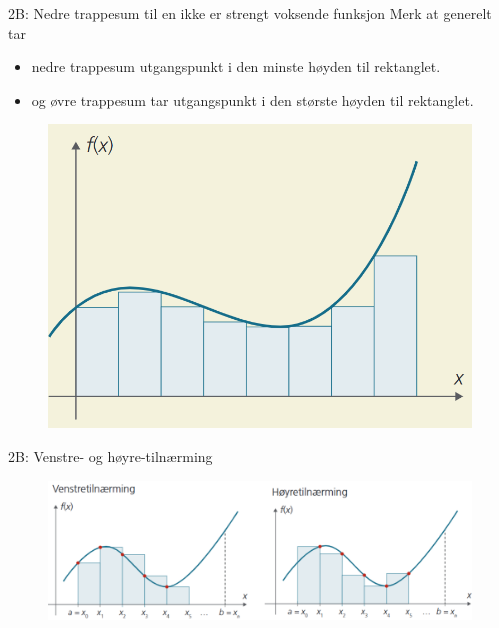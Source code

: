 
\blueheader
\begin{frame}{2B: Nedre trappesum til en ikke er strengt voksende funksjon}
Merk at generelt tar 
\begin{itemize}
    \item nedre trappesum utgangspunkt i den minste høyden til rektanglet.\\
    \item og øvre trappesum tar utgangspunkt i den største høyden til rektanglet.
\end{itemize}
\begin{figure}
    \centering
    \includegraphics[width=0.6\linewidth]{R2-K2A-17.png}
\end{figure}
\end{frame}


\blueheader
\begin{frame}{2B: Venstre- og høyre-tilnærming}
\begin{figure}
    \centering
    \includegraphics[width=\linewidth]{R2-K2B-2.png}
\end{figure}
\end{frame}

